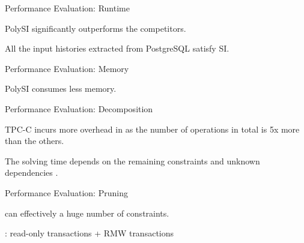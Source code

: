 \begin{frame}{Performance Evaluation: Runtime}
	\centerline{PolySI significantly outperforms the competitors.}


	\vspace{-0.30cm}
	\centerline{All the input histories extracted from PostgreSQL satisfy SI.}
\end{frame}

\begin{frame}{Performance Evaluation: Memory}
	\centerline{PolySI consumes less memory.}
\end{frame}

\begin{frame}{Performance Evaluation: Decomposition}
	\begin{center}
		TPC-C incurs more overhead in 
		as the number of operations in total is 5x more than the others.

		\vspace{0.30cm}
		\vspace{0.30cm}

		The solving time depends on the remaining constraints
		and unknown dependencies .
	\end{center}
\end{frame}

\begin{frame}{Performance Evaluation: Pruning}
	\begin{center}
		\polysi{} can effectively  a huge number of constraints.

		\vspace{0.30cm}
		
		\vspace{0.30cm}

		: read-only transactions + RMW transactions
	\end{center}
\end{frame}

